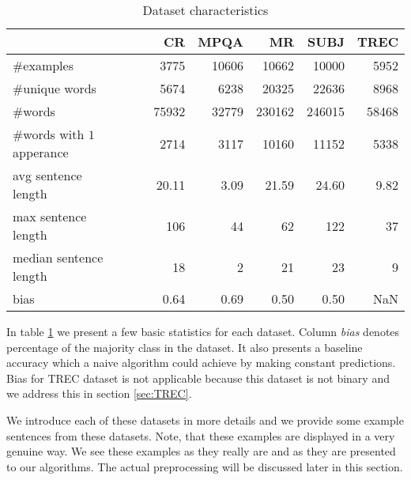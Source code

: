 \begin{table}[h]
\begin{center}

\begin{tabular}{l|rrrrr}
\toprule
{} &        CR &      MPQA &         MR &      SUBJ &      TREC \\\hline
\midrule
\#examples                                &   3775 &  10606 &   10662 &   10000 &   5952 \\\hline
\#unique words                            &   5674 &   6238 &   20325 &   22636 &   8968 \\\hline
\#words                                   &  75932 &  32779 &  230162 &  246015 &  58468 \\\hline
\specialcell{\#words with\\$1$ apperance} &   2714 &   3117 &   10160 &   11152 &   5338 \\\hline
\specialcell{avg sentence\\length}       &     20.11 &      3.09 &      21.59 &      24.60 &      9.82 \\\hline
\specialcell{max sentence\\length}       &    106 &     44 &      62 &     122 &     37 \\\hline
\specialcell{median sentence\\length}    &     18 &      2 &      21 &      23 &      9 \\\hline
bias                                     &      0.64 &      0.69 &       0.50 &       0.50 &       NaN \\
\bottomrule
\end{tabular}

\caption[Dataset characteristics]{Dataset characteristics}
\label{tab:datasets:stats}
\end{center}
\end{table}


    In table \ref{tab:datasets:stats} we present a few basic statistics for each dataset.
    Column \emph{bias} denotes percentage of the majority class in the dataset.
    It also presents a baseline accuracy which a naive algorithm could achieve by making constant predictions. 
    Bias for TREC dataset is not applicable because this dataset is not binary and we address this in section \ref{sec:TREC}.
    
    We introduce each of these datasets in more details and we provide some example sentences from these datasets.
    Note, that these examples are displayed in a very genuine way. 
    We see these examples as they really are and as they are presented to our algorithms.
    The actual preprocessing will be discussed later in this section.
    
